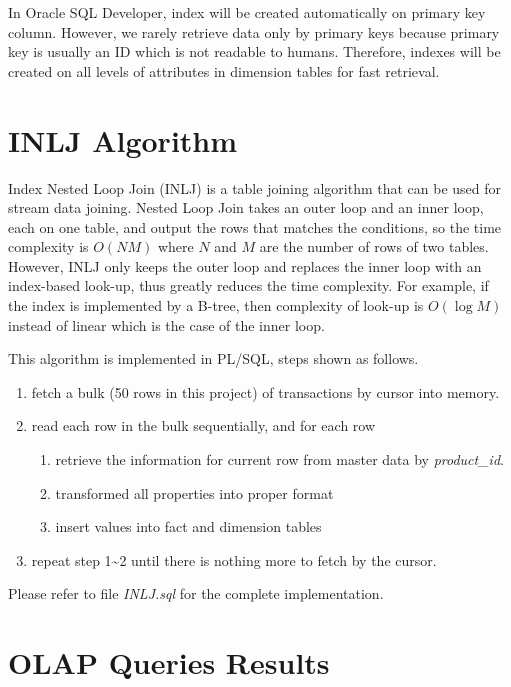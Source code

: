 \documentclass[
  a4paper,
]{article}
\providecommand{\tightlist}{%
  \setlength{\itemsep}{0pt}\setlength{\parskip}{0pt}}
\begin{document}
In Oracle SQL Developer, index will be created automatically on primary
key column. However, we rarely retrieve data only by primary keys
because primary key is usually an ID which is not readable to humans.
Therefore, indexes will be created on all levels of attributes in
dimension tables for fast retrieval.

\hypertarget{inlj-algorithm}{%
\section{INLJ Algorithm}\label{inlj-algorithm}}

Index Nested Loop Join (INLJ) is a table joining algorithm that can be
used for stream data joining. Nested Loop Join takes an outer loop and
an inner loop, each on one table, and output the rows that matches the
conditions, so the time complexity is \(O(N M)\) where \(N\) and \(M\)
are the number of rows of two tables. However, INLJ only keeps the outer
loop and replaces the inner loop with an index-based look-up, thus
greatly reduces the time complexity. For example, if the index is
implemented by a B-tree, then complexity of look-up is \(O(\log M)\)
instead of linear which is the case of the inner loop.

This algorithm is implemented in PL/SQL, steps shown as follows.

\begin{enumerate}
\tightlist
\item
  fetch a bulk (50 rows in this project) of transactions by cursor into
  memory.
\item
  read each row in the bulk sequentially, and for each row

  \begin{enumerate}
  \tightlist
  \item
    retrieve the information for current row from master data by
    \emph{product\_id}.
  \item
    transformed all properties into proper format
  \item
    insert values into fact and dimension tables
  \end{enumerate}
\item
  repeat step 1\textasciitilde2 until there is nothing more to fetch by
  the cursor.
\end{enumerate}

Please refer to file \emph{INLJ.sql} for the complete implementation.

\hypertarget{olap-queries-results}{%
\section{OLAP Queries Results}\label{olap-queries-results}}
\end{document}
